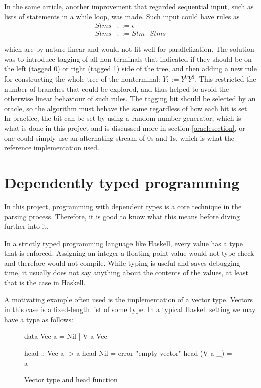 \documentclass[a4paper,12pt,twosided]{report}
\begin{document}
In the same article, another improvement that regarded sequential input, such as
lists of statements in a while loop, was made. Such input could have rules as
\begin{align*}
Stms &::= \epsilon \\
Stms &::= Stm\text{ }Stms
\end{align*}

which are by nature linear and would not fit well for parallelization. The
solution was to introduce tagging of all non-terminals that indicated if they
should be on the left (tagged 0) or right (tagged 1) side of the tree, and then
adding a new rule for constructing the whole tree of the nonterminal: $Y ::=
Y^0Y^1$. This restricted the number of branches that could be explored, and thus
helped to avoid the otherwise linear behaviour of such rules. The tagging bit
should be selected by an oracle, so the algorithm must behave the same
regardless of how each bit is set. In practice, the bit can be set by using a
random number generator, which is what is done in this project and is discussed
more in section \ref{oraclesection}, or one could simply use an alternating
stream of 0s and 1s, which is what the reference implementation used. 

\section{Dependently typed programming}
In this project, programming with dependent types is a core technique in the
parsing process. Therefore, it is good to know what this means before diving
further into it.

In a strictly typed programming language like Haskell, every value has a type
that is enforced. Assigning an integer a floating-point value would not
type-check and therefore would not compile. While typing is useful and saves
debugging time, it usually does not say anything about the contents of the
values, at least that is the case in Haskell.

A motivating example often used is the implementation of a vector type. Vectors
in this case is a fixed-length list of some type. In a typical Haskell setting
we may have a type as follows:

\begin{figure}[H]
\begin{code}
data Vec a = Nil | V a Vec

head :: Vec a -> a
head Nil = error "empty vector"
head (V a _) = a
\end{code}
\caption{Vector type and head function}
\end{figure}
\end{document}
